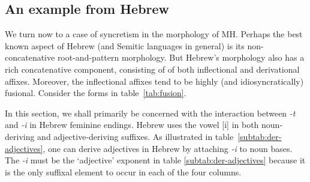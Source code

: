 \subsection{An example from Hebrew}
\label{sec:heb-example}
We turn now to a case of syncretism in the morphology of \ac{MH}. Perhaps
the best known aspect of Hebrew (and Semitic languages in general) is its 
non-concatenative root-and-pattern morphology. But 
Hebrew's morphology also has a rich concatenative component, consisting of
of both inflectional and derivational affixes. Moreover, the inflectional affixes tend to be
highly (and idiosyncratically) fusional.  
Consider the forms in table~\ref{tab:fusion}. 

In this section, we shall primarily be concerned with the
interaction between \textit{-t} and \textit{-i} in Hebrew feminine endings.
Hebrew uses the vowel [i] 
in both noun-deriving and adjective-deriving suffixes. 
As illustrated in table~\ref{subtab:der-adjectives}, 
one can derive adjectives 
in Hebrew by attaching \textit{-i} to noun bases. The \textit{-i} 
must be the `adjective' exponent
in table \ref{subtab:der-adjectives} because it is the only suffixal 
element to occur in each
of the four columns. %
